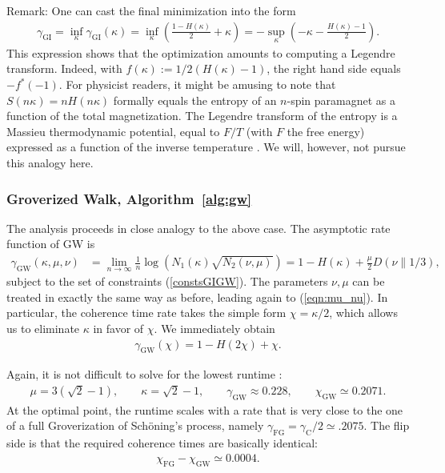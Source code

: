 \documentclass[a4paper,aps,floatfix]{revtex4}
\begin{document}
Remark:
One can cast the final minimization into the form
\begin{align*}
	\gamma_{\textrm{GI}} = 
	\inf_{\kappa} \gamma_{\textrm{GI}}(\kappa)
	=
	\inf_{\kappa} 
	\left(
		\frac{1-H(\kappa)}2 + \kappa
	\right)
	=
	-
	\sup_{\kappa} 
	\left(
		-\kappa
		-	
		\frac{H(\kappa)-1}2
	\right).
\end{align*}
This expression shows that the optimization amounts to computing a Legendre transform.
Indeed, with $f(\kappa):=1/2(H(\kappa)-1)$, the right hand side equals $-f^*(-1)$.
For physicist readers, it might be amusing to note that $S(n \kappa)=n H(n \kappa)$ formally equals the entropy of an $n$-spin paramagnet as a function of the total magnetization.
The Legendre transform of the entropy is a Massieu thermodynamic potential, equal to $F/T$ (with $F$ the free energy) expressed as a function of the inverse temperature \cite[Chapter~5.4]{callen}.
We will, however, not pursue this analogy here.

\subsubsection{Groverized Walk, Algorithm~\ref{alg:gw}}

The analysis proceeds in close analogy to the above case.
The asymptotic rate function of GW is 
\begin{align}
    \gamma_{\textrm{GW}}(\kappa,\mu,\nu) 
		&= 
		\lim_{n \rightarrow \infty}\frac1n \log (N_1(\kappa)\sqrt{N_2(\nu,\mu)})  
    = 
		{1 - H(\kappa)} + \frac \mu{2} D(\nu \parallel 1/3) \label{rateGW},
\end{align}
subject to the set of constraints (\ref{constsGIGW}). 
The parameters $\nu, \mu$ can be treated in exactly the same way as before, leading again to (\ref{eqn:mu_nu}).
In particular, the coherence time rate takes the simple form $\chi=\kappa/2$, which allows us to eliminate $\kappa$ in favor of $\chi$.
We immediately obtain
\begin{align}
    \gamma_{\textrm{GW}}(\chi) 
		= 1-H(2\chi) + \chi.
\end{align}

Again, it is not difficult to solve for the lowest runtime \cite{our-data}: 
\begin{align}\label{eqn:gw_optimal}
	\mu
	=
  3(\sqrt{2}-1), 
	\qquad
	\kappa = \sqrt{2}-1,
	\qquad
	\gamma_{\textrm{GW}} \approx 0.228,
	\qquad
	\chi_{\textrm{GW}} 
	\simeq  0.2071.
\end{align}
At the optimal point, the runtime scales with a rate that is very close to the one of a full Groverization of Sch\"oning's process, namely $\gamma_{\mathrm{FG}}=\gamma_{\mathrm{C}}/2\simeq .2075$.
The flip side is that the required coherence times are basically identical:
\begin{align*}
	\chi_{\textrm{FG}} 
	-
	\chi_{\textrm{GW}} 
	\simeq
	0.0004.
\end{align*}
\end{document}
